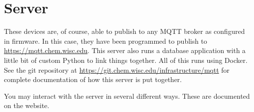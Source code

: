 \documentclass{manual}
\begin{document}

\section{Server}

These devices are, of course, able to publish to any MQTT broker as configured in firmware.
In this case, they have been programmed to publish to \url{https://mqtt.chem.wisc.edu}.
This server also runs a database application with a little bit of custom Python to link things together.
All of this runs using Docker.
See the git repository at \url{https://git.chem.wisc.edu/infrastructure/mqtt} for complete documentation of how this server is put together.

You may interact with the server in several different ways.
These are documented on the website.
\end{document}
